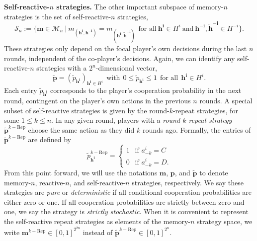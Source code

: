 \documentclass[9pt,twoside,lineno]{pnas-new}
\theoremstyle{plainCl1}
\theoremstyle{plainCl2}
\begin{document}
\noindent
{\bfseries Self-reactive-$n$ strategies.}
The other important subspace of memory-$n$ strategies is the set of self-reactive-$n$ strategies, 
\begin{equation}
\mathcal{S}_n:=\Big\{ \mathbf{m}\!\in\!\mathcal{M}_n ~\Big|~ m_{(\mathbf{h^i},\mathbf{h^{-i}})}\!=\!m_{(\mathbf{h^i},\mathbf{\tilde h^{-i}})}~~\text{for all}~\mathbf{h^i}\!\in\!H^i~\text{and}~\mathbf{h^{-i}},\mathbf{\tilde h^{-i}}\!\in\!H^{-i}\Big\}.
\end{equation}
These strategies only depend on the focal player's own decisions during the last $n$ rounds, independent of the co-player's decisions. 
Again, we can identify any self-reactive-$n$ strategies with a $2^n$-dimensional vector, 
\begin{equation}
\mathbf{\tilde{p}} = (\tilde{p}_\mathbf{h^{i}})_{\mathbf{h^{i}} \in H^i}  ~~\text{with}~~ 0\!\le\!\tilde p_\mathbf{h^i}\!\le\!1 ~~\text{for all}~~ \mathbf{h^i}\!\in\! H^i.
\end{equation}
Each entry $\tilde{p}_{\mathbf{h^{i}}}$ corresponds to the player's cooperation
probability in the next round, contingent on the player's own actions in
the previous $n$ rounds.
A special subset of self-reactive strategies is given by the round-$k$-repeat strategies, for some $1\le
k\le n$. 
In any given round, players with a {\it round-$k$-repeat strategy} $\mathbf{\tilde p}^{k-\text{Rep}}$ choose the same action as they did $k$ rounds ago. 
Formally, the entries of $\mathbf{\tilde p}^{k-\text{Rep}}$ are defined by
\begin{equation} \label{Eq:Repeat}
\tilde p^{k-\text{Rep}}_\mathbf{h^i} =
\left\{
\begin{array}{l}
1~~ \text{ if } a^i_{-k}\!=\!C\\[0.1cm]
0~~ \text{ if } a^i_{-k}\!=\!D.
\end{array}
\right.
\end{equation}
From this point forward, we will use the notations $\mathbf{m}$, $\mathbf{p}$,
and $\mathbf{\tilde{p}}$ to denote memory-$n$, reactive-$n$, and
self-reactive-$n$ strategies, respectively. 
We say these strategies are {\it pure} or {\it deterministic} if all conditional cooperation probabilities are either zero or one. 
If all cooperation probabilities are strictly between zero and one, we say the strategy is {\it strictly stochastic}. 
When it is convenient to represent the self-reactive repeat strategies as elements of the memory-$n$ strategy space, we write $\mathbf{m}^{k-\text{Rep}}\!\in\![0,1]^{2^{2n}}$ instead of $\mathbf{\tilde p}^{k-\text{Rep}}\!\in\![0,1]^{2^n}$.
\end{document}
